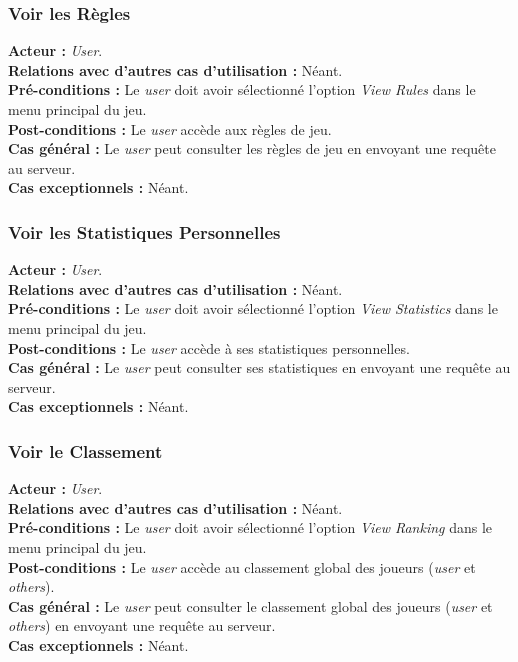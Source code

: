 \documentclass[10pt, a4paper]{article}
\begin{document}
\subsubsection{Voir les Règles}
\textbf{Acteur :} \textit{User}.\\
\textbf{Relations avec d'autres cas d'utilisation :} Néant.\\
\textbf{Pré-conditions :} Le \textit{user} doit avoir sélectionné l'option \textit{View Rules} dans le menu principal du jeu.\\
\textbf{Post-conditions :} Le \textit{user} accède aux règles de jeu.\\
\textbf{Cas général :} Le \textit{user} peut consulter les règles de jeu en envoyant une requête au serveur.\\
\textbf{Cas exceptionnels :} Néant.

\subsubsection{Voir les Statistiques Personnelles}
\textbf{Acteur :} \textit{User}.\\
\textbf{Relations avec d'autres cas d'utilisation :} Néant.\\
\textbf{Pré-conditions :} Le \textit{user} doit avoir sélectionné l'option \textit{View Statistics} dans le menu principal du jeu.\\
\textbf{Post-conditions :} Le \textit{user} accède à ses statistiques personnelles.\\
\textbf{Cas général :} Le \textit{user} peut consulter ses statistiques en envoyant une requête au serveur.\\
\textbf{Cas exceptionnels :} Néant.

\subsubsection{Voir le Classement}

\textbf{Acteur :} \textit{User}.\\
\textbf{Relations avec d'autres cas d'utilisation :} Néant.\\
\textbf{Pré-conditions :} Le \textit{user} doit avoir sélectionné l'option \textit{View Ranking} dans le menu principal du jeu.\\
\textbf{Post-conditions :} Le \textit{user} accède au classement global des joueurs (\textit{user} et \textit{others}).\\
\textbf{Cas général :} Le \textit{user} peut consulter le classement global des joueurs (\textit{user} et \textit{others}) en envoyant une requête au serveur.\\
\textbf{Cas exceptionnels :} Néant.
\end{document}
